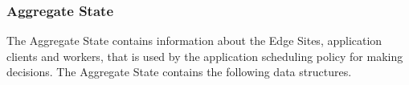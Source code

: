 \subsubsection{Aggregate State}
\label{sec:aggr_state}
The Aggregate State contains information about the Edge Sites, application clients and workers, that is used by the application scheduling policy for making decisions. The Aggregate State contains the following data structures.
